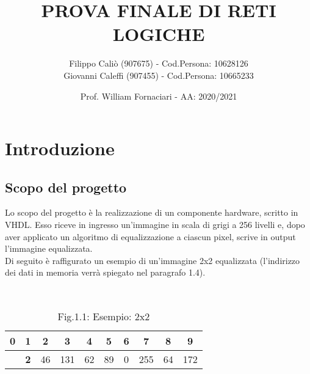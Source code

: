 \documentclass[12pt, table, xcdraw]{article}
\title{PROVA FINALE DI RETI LOGICHE}
\date{Prof. William Fornaciari - AA: 2020/2021}
\author{Filippo Caliò (907675) - Cod.Persona: 10628126 \\ Giovanni Caleffi (907455) - Cod.Persona: 10665233}
\begin{document}
\maketitle
{}
\tableofcontents

\newpage
{}

\section{Introduzione}

\subsection{Scopo del progetto}
Lo scopo del progetto è la realizzazione di un componente hardware, scritto in VHDL. Esso riceve in ingresso un'immagine in scala di grigi a 256 livelli e, dopo aver applicato un algoritmo di equalizzazione a ciascun pixel, scrive in output l'immagine equalizzata.\\
Di seguito è raffigurato un esempio di un'immagine 2x2 equalizzata (l'indirizzo dei dati in memoria verrà spiegato nel paragrafo 1.4).

\begin{table}[h!]
  \begin{center}
    \
	\begin{tabular}{cccccccccc}
	0                                                        & 1                                                       & 2                                               & 3                                                & 4                                               & 5                                               & 6                                              & 7                                                & 8                                               & 9                                                \\ \hline
	\rowcolor[HTML]{EFEFEF} 
	\multicolumn{1}{|c|}{\cellcolor[HTML]{EFEFEF}\textbf{2}} & \multicolumn{1}{c|}{\cellcolor[HTML]{EFEFEF}\textbf{2}} & \multicolumn{1}{c|}{\cellcolor[HTML]{EFEFEF}46} & \multicolumn{1}{c|}{\cellcolor[HTML]{EFEFEF}131} & \multicolumn{1}{c|}{\cellcolor[HTML]{EFEFEF}62} & \multicolumn{1}{c|}{\cellcolor[HTML]{EFEFEF}89} & \multicolumn{1}{c|}{\cellcolor[HTML]{EFEFEF}0} & \multicolumn{1}{c|}{\cellcolor[HTML]{EFEFEF}255} & \multicolumn{1}{c|}{\cellcolor[HTML]{EFEFEF}64} & \multicolumn{1}{c|}{\cellcolor[HTML]{EFEFEF}172} \\ \hline
	\end{tabular}
\caption*{Fig.1.1: Esempio: 2x2}
  \end{center}
\end{table}
\end{document}
